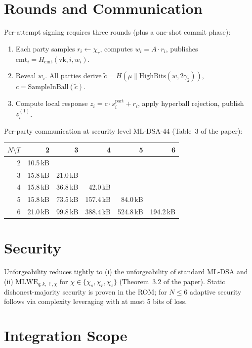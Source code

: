 \documentclass[11pt]{article}
\begin{document}
\section{Rounds and Communication}

Per-attempt signing requires three rounds (plus a one-shot commit phase):
\begin{enumerate}
  \item Each party samples $r_i \leftarrow \chi_r$, computes
        $w_i = A \cdot r_i$, publishes $\mathrm{cmt}_i = H_\mathrm{cmt}(\mathrm{vk}, i, w_i)$.
  \item Reveal $w_i$. All parties derive
        $\tilde c = H(\mu \| \mathrm{HighBits}(w, 2\gamma_2))$,
        $c = \mathrm{SampleInBall}(\tilde c)$.
  \item Compute local response $z_i = c \cdot s^{\mathrm{part}}_i + r_i$,
        apply hyperball rejection, publish $z_i^{(1)}$.
\end{enumerate}

Per-party communication at security level ML-DSA-44 (Table~3 of the paper):

\begin{center}
\begin{tabular}{rrrrrr}
\toprule
$N \setminus T$ & 2 & 3 & 4 & 5 & 6 \\
\midrule
2 & 10.5\,kB & & & & \\
3 & 15.8\,kB & 21.0\,kB & & & \\
4 & 15.8\,kB & 36.8\,kB & 42.0\,kB & & \\
5 & 15.8\,kB & 73.5\,kB & 157.4\,kB & 84.0\,kB & \\
6 & 21.0\,kB & 99.8\,kB & 388.4\,kB & 524.8\,kB & 194.2\,kB \\
\bottomrule
\end{tabular}
\end{center}

\section{Security}

Unforgeability reduces tightly to (i) the unforgeability of standard ML-DSA
and (ii) $\mathrm{MLWE}_{q,k,\ell,\chi}$ for
$\chi \in \{\chi_s, \chi_r, \chi_z\}$ (Theorem~3.2 of the paper). Static
dishonest-majority security is proven in the ROM; for $N \leq 6$ adaptive
security follows via complexity leveraging with at most 5 bits of loss.

\section{Integration Scope}
\end{document}
